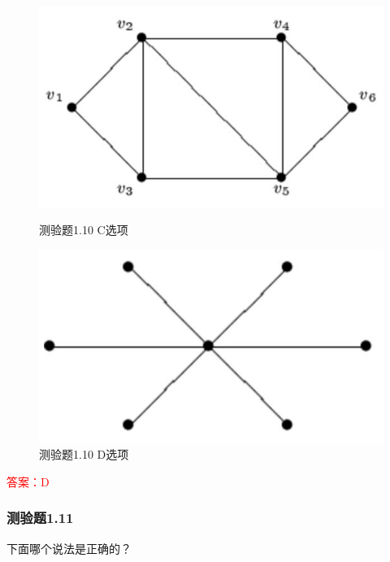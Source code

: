 \documentclass[UTF8, heading=true]{ctexart}
\begin{document}
\begin{figure}[htbp]
\centering
\begin{minipage}[t]{0.35\textwidth}
    \centering
    \includegraphics[width=1\textwidth]{1.10_3.jpg} %
    \caption{测验题1.10 C选项}
\end{minipage}
  \hspace{0.1\textwidth} %
\begin{minipage}[t]{0.35\textwidth}
    \centering
    \includegraphics[width=1\textwidth]{1.10_4.jpg} %
    \caption{测验题1.10 D选项}
\end{minipage}
\end{figure}

\textcolor{red}{答案：D}



\subsubsection{测验题1.11}

下面哪个说法是正确的？
\end{document}
